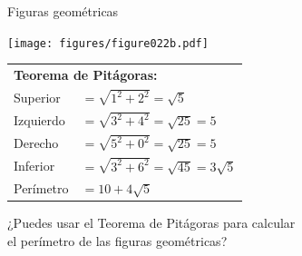 \documentclass[14pt,aspectratio=169,usenames,dvipsnames]{beamer}
\begin{document}
    \begin{frame}{Figuras geométricas}
        \begin{center}
            \begin{minipage}{0.5\textwidth}%
                \centering \texttt{[image: figures/figure022b.pdf]}
            \end{minipage}\hfill\begin{minipage}{0.49\textwidth} \footnotesize

                \hspace{-0.5em}\begin{tabular}{ll}
                    \multicolumn{2}{l}{\small \textbf{Teorema de Pitágoras:}}          \\[4ex]
                    Superior  & $\!\!\!\!\!= \sqrt{1^2 + 2^2} = \sqrt{5}$              \\[1.5ex]
                    Izquierdo & $\!\!\!\!\!= \sqrt{3^2 + 4^2} = \sqrt{25} = 5$         \\[1.5ex]
                    Derecho   & $\!\!\!\!\!= \sqrt{5^2 + 0^2} = \sqrt{25} = 5$         \\[1.5ex]
                    Inferior  & $\!\!\!\!\!= \sqrt{3^2 + 6^2} = \sqrt{45} = 3\sqrt{5}$ \\[4ex]
                    Perímetro & $\!\!\!\!\!= 10 + 4\sqrt{5}$
                \end{tabular}
            \end{minipage}

            \bigskip \bigskip

            ¿Puedes usar el Teorema de Pitágoras para calcular\\ el perímetro de las figuras geométricas?
        \end{center}

    \end{frame}

\end{document}
